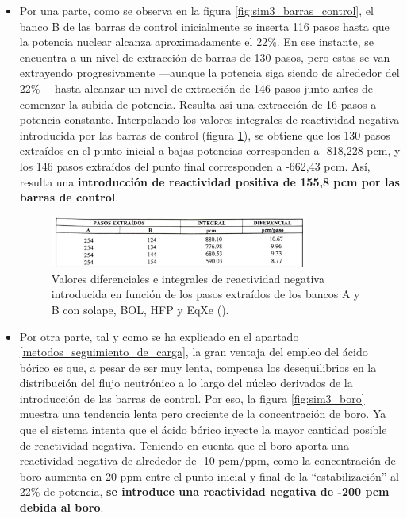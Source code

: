 \begin{itemize}
  \item Por una parte, como se observa en la figura \ref{fig:sim3_barras_control}, el banco B de las barras de control inicialmente se inserta 116 pasos hasta que la potencia nuclear alcanza aproximadamente el 22\%. En ese instante, se encuentra a un nivel de extracción de barras de 130 pasos, pero estas se van extrayendo progresivamente ---aunque la potencia siga siendo de alrededor del 22\%--- hasta alcanzar un nivel de extracción de 146 pasos junto antes de comenzar la subida de potencia. Resulta así una extracción de 16 pasos a potencia constante. Interpolando los valores integrales de reactividad negativa introducida por las barras de control (figura \ref{fig:tabla_reactividad_barras_control}), se obtiene que los 130 pasos extraídos en el punto inicial a bajas potencias corresponden a -818,228 pcm, y los 146 pasos extraídos del punto final corresponden a -662,43 pcm. Así, resulta una \textbf{introducción de reactividad positiva de 155,8 pcm por las barras de control}.
  
  \begin{figure}[!h]
    \centering
    \includegraphics[width=0.8\textwidth]{content/figures/tabla_reactividad_barras_control.pdf}
    \caption{Valores diferenciales e integrales de reactividad negativa introducida en función de los pasos extraídos de los bancos A y B con solape, BOL, HFP y EqXe (\cite{enusa_1998}).}
    \label{fig:tabla_reactividad_barras_control}
  \end{figure}

  \item Por otra parte, tal y como se ha explicado en el apartado \ref{metodos_seguimiento_de_carga}, la gran ventaja del empleo del ácido bórico es que, a pesar de ser muy lenta, compensa los desequilibrios en la distribución del flujo neutrónico a lo largo del núcleo derivados de la introducción de las barras de control. Por eso, la figura \ref{fig:sim3_boro} muestra una tendencia lenta pero creciente de la concentración de boro. Ya que el sistema intenta que el ácido bórico inyecte la mayor cantidad posible de reactividad negativa. Teniendo en cuenta que el boro aporta una reactividad negativa de alrededor de -10 pcm/ppm, como la concentración de boro aumenta en 20 ppm entre el punto inicial y final de la ``estabilización'' al 22\% de potencia, \textbf{se introduce una reactividad negativa de -200 pcm debida al boro}.
  

\end{itemize}
